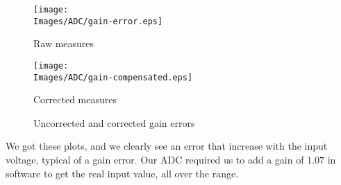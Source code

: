 \begin{figure}[!hbt]
    \centering
    \begin{minipage}[c]{0.48\textwidth}
        \centering
        \texttt{[image: \\Images/ADC/gain-error.eps]}
        \caption{Raw measures}\label{img:adc_error}
    \end{minipage}%
    \hfill%
    \begin{minipage}[c]{0.48\textwidth}
        \centering
        \texttt{[image: \\Images/ADC/gain-compensated.eps]}
        \caption{Corrected measures}\label{img:adc_corrected}
    \end{minipage}%
    \caption{Uncorrected and corrected gain errors}\label{img:adc_gainerr}
\end{figure}
\FloatBarrier

We got these plots, and we clearly see an error that increase with the input
voltage, typical of a gain error. Our ADC required us to add a gain of $1.07$
in software to get the real input value, all over the range.


